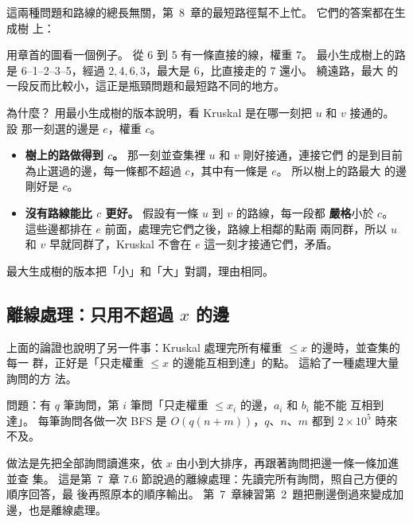 這兩種問題和路線的總長無關，第~8~章的最短路徑幫不上忙。 它們的答案都在生成樹
上：

\begin{center}
\end{center}

用章首的圖看一個例子。 從 6 到 5 有一條直接的線，權重 $7$。 最小生成樹上的路是
6--1--2--3--5，經過 $2, 4, 6, 3$，最大是 $6$，比直接走的 $7$ 還小。 繞遠路，最大
的一段反而比較小，這正是瓶頸問題和最短路不同的地方。

為什麼？ 用最小生成樹的版本說明，看 Kruskal 是在哪一刻把 $u$ 和 $v$ 接通的。 設
那一刻選的邊是 $e$，權重 $c$。

\begin{itemize}
\item \textbf{樹上的路做得到 $c$。} 那一刻並查集裡 $u$ 和 $v$ 剛好接通，連接它們
的是到目前為止選過的邊，每一條都不超過 $c$，其中有一條是 $e$。 所以樹上的路最大
的邊剛好是 $c$。
\item \textbf{沒有路線能比 $c$ 更好。} 假設有一條 $u$ 到 $v$ 的路線，每一段都
\textbf{嚴格}小於 $c$。 這些邊都排在 $e$ 前面，處理完它們之後，路線上相鄰的點兩
兩同群，所以 $u$ 和 $v$ 早就同群了，Kruskal 不會在 $e$ 這一刻才接通它們，矛盾。
\end{itemize}

最大生成樹的版本把「小」和「大」對調，理由相同。

\subsection{離線處理：只用不超過 $x$ 的邊}
\label{sec:mst-offline}

上面的論證也說明了另一件事：Kruskal 處理完所有權重 $\le x$ 的邊時，並查集的每一
群，正好是「只走權重 $\le x$ 的邊能互相到達」的點。 這給了一種處理大量詢問的方
法。

問題：有 $q$ 筆詢問，第 $i$ 筆問「只走權重 $\le x_i$ 的邊，$a_i$ 和 $b_i$ 能不能
互相到達」。 每筆詢問各做一次 BFS 是 $O(q(n + m))$，$q$、$n$、$m$ 都到
$2 \times 10^5$ 時來不及。

做法是先把全部詢問讀進來，依 $x$ 由小到大排序，再跟著詢問把邊一條一條加進並查
集。 這是第~7~章 7.6 節說過的離線處理：先讀完所有詢問，照自己方便的順序回答，最
後再照原本的順序輸出。 第~7~章練習第~2~題把刪邊倒過來變成加邊，也是離線處理。


